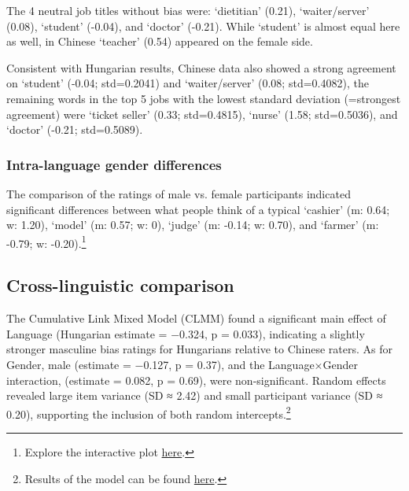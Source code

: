 \documentclass[10pt, a4paper]{article}
\newcommand{\zh}[1]{\simplifiedchinesefont{#1}\rmfamily}
\begin{document}
The 4 neutral job titles without bias were: \zh{营养师} `dietitian' (0.21), \zh{服务员} `waiter/server' (0.08), \zh{学生} `student' (-0.04), and \zh{医生} `doctor' (-0.21). While `student' is almost equal here as well, in Chinese \zh{教师} `teacher' (0.54) appeared on the female side. 

Consistent with Hungarian results, Chinese data also showed a strong agreement on \zh{学生} `student' (-0.04; std=0.2041) and \zh{服务员} `waiter/server' (0.08; std=0.4082), the remaining words in the top 5 jobs with the lowest standard deviation (=strongest agreement) were \zh{售票员} `ticket seller' (0.33; std=0.4815), \zh{护士} `nurse' (1.58; std=0.5036), and \zh{医生} `doctor' (-0.21; std=0.5089).


\subsubsection{Intra-language gender differences}

The comparison of the ratings of male vs. female participants indicated significant differences between what people think of a typical \zh{收银员} `cashier' (m: 0.64; w: 1.20), \zh{模特} `model' (m: 0.57; w: 0), \zh{法官} `judge' (m: -0.14; w: 0.70), and \zh{农民} `farmer' (m: -0.79; w: -0.20).\footnote{Explore the interactive plot \href{https://anonymous.4open.science/api/repo/occupational-gender-bias/file/occupations_zh_gender.html?v=b5218ede}{here}.}




\subsection{Cross-linguistic comparison}

The Cumulative Link Mixed Model (CLMM) found a significant main effect of Language (Hungarian estimate = −0.324, p = 0.033), indicating a slightly stronger masculine bias ratings for Hungarians relative to Chinese raters. As for Gender, male (estimate = −0.127, p = 0.37), and the Language×Gender interaction, (estimate = 0.082, p = 0.69), were non‑significant. Random effects revealed large item variance (SD ≈ 2.42) and small participant variance (SD ≈ 0.20), supporting the inclusion of both random intercepts.\footnote{Results of the model can be found \href{https://anonymous.4open.science/r/occupational-gender-bias/clmm_results.txt}{here}.}
\end{document}
